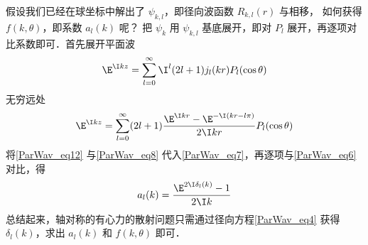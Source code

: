 假设我们已经在球坐标中解出了 $\psi_{k,l}$，即径向波函数 $R_{k,l}(r)$ 与相移， 如何获得 $f(k,\theta )$，即系数 $a_l(k)$ 呢？ 把 $\psi_k$ 用 $\psi_{k,l}$ 基底展开，即对 $P_l$ 展开，再逐项对比系数即可．首先展开平面波
\begin{equation}
\E^{\I kz} = \sum_{l = 0}^\infty  \I^l (2l + 1) j_l(kr) P_l(\cos \theta)
\end{equation}
无穷远处
\begin{equation}\label{ParWav_eq12}
\E^{\I kz} = \sum_{l=0}^\infty  (2l + 1)\frac{\E^{\I kr} - \E^{-\I(kr - l\pi)}}{2\I kr} P_l(\cos \theta)
\end{equation}
将\autoref{ParWav_eq12} 与\autoref{ParWav_eq8} 代入\autoref{ParWav_eq7}，再逐项与\autoref{ParWav_eq6} 对比，得
\begin{equation}
a_l(k) = \frac{\E^{2\I \delta_l(k)} - 1}{2\I k}
\end{equation}
总结起来，轴对称的有心力的散射问题只需通过径向方程\autoref{ParWav_eq4} 获得 $\delta_l (k)$，求出 $a_l(k)$ 和 $f(k, \theta)$ 即可．

